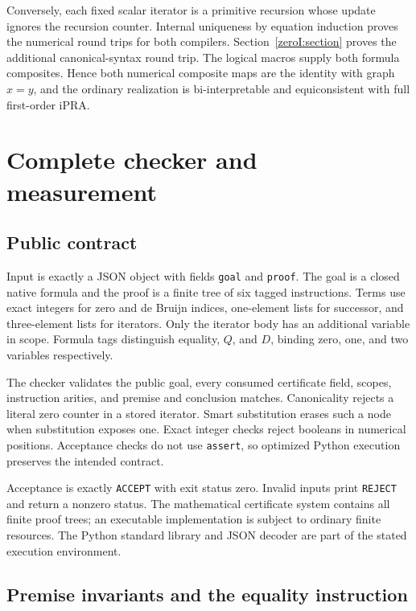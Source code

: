 \documentclass[11pt,a4paper]{article}
\theoremstyle{definition}
\begin{document}
Conversely, each fixed scalar iterator is a primitive recursion whose
update ignores the recursion counter. Internal uniqueness by equation
induction proves the numerical round trips for both compilers.
Section~\ref{zeroI:section} proves the additional canonical-syntax
round trip. The logical macros supply both formula composites.
Hence both numerical composite maps are the identity with graph \(x=y\),
and the ordinary realization is bi-interpretable and equiconsistent
with full first-order iPRA.

\section{Complete checker and measurement}
\label{sec:implementation}

\subsection{Public contract}

Input is exactly a JSON object with fields \texttt{goal} and
\texttt{proof}. The goal is a closed native formula and the proof is a
finite tree of six tagged instructions. Terms use exact integers for
zero and de Bruijn indices, one-element lists for successor, and
three-element lists for iterators. Only the iterator body has an
additional variable in scope. Formula tags distinguish equality,
\(Q\), and \(D\), binding zero, one, and two variables respectively.

The checker validates the public goal, every consumed certificate field,
scopes, instruction arities, and premise and conclusion matches.
Canonicality rejects a literal zero counter in a stored iterator.
Smart substitution erases such a node when substitution exposes one.
Exact integer checks reject booleans in numerical positions.
Acceptance checks do not use \texttt{assert}, so optimized Python
execution preserves the intended contract.

Acceptance is exactly \texttt{ACCEPT} with exit status zero.
Invalid inputs print \texttt{REJECT} and return a nonzero status.
The mathematical certificate system contains all finite proof trees;
an executable implementation is subject to ordinary finite resources.
The Python standard library and JSON decoder are part of the stated
execution environment.

\subsection{Premise invariants and the equality instruction}
\end{document}
